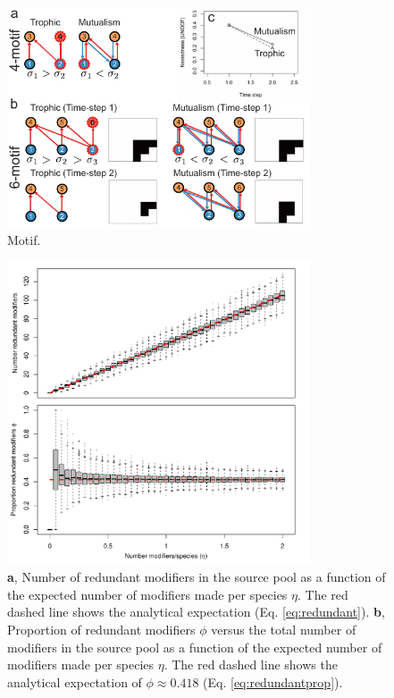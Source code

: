 \documentclass[twocolumn,preprintnumbers,amsmath,amssymb,superscriptaddress,linenumbers]{revtex4-1}
\begin{document}
\begin{figure}[h!]
\centering
\includegraphics[width=0.8\textwidth]{fig_motif.pdf}
\caption{
Motif.
}
\label{fig:motif}
\end{figure}



\begin{figure}[h!]
\centering
\includegraphics[width=0.8\textwidth]{fig_redundancy.pdf}
\caption{
\textbf{a}, Number of redundant modifiers in the source pool as a function of the expected number of modifiers made per species $\eta$.
The red dashed line shows the analytical expectation (Eq. \ref{eq:redundant}).
\textbf{b}, Proportion of redundant modifiers $\phi$ versus the total number of modifiers in the source pool as a function of the expected number of modifiers made per species $\eta$.
The red dashed line shows the analytical expectation of $\phi \approx 0.418$ (Eq. \ref{eq:redundantprop}).
}
\label{fig:redundancy}
\end{figure}
\end{document}
